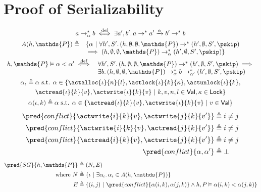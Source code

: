 \section{Proof of Serializability}

\begin{gather*}
a \rightarrow^*_\alpha b \overset{\text{def}}{\iff} \exists a', b' \ldotp a \rightarrow^* a' \xrightarrow{\alpha} b' \rightarrow^* b
\\
\begin{array}{l l}
	A(h, \mathds{P}) \triangleq &
	\{ \alpha\ |\ \forall h', S' \ldotp (h, \emptyset, \emptyset, \mathds{P}) \rightarrow^* (h', \emptyset, S', \pskip) \\
	& \implies (h, \emptyset, \emptyset, \mathds{P}) \rightarrow_\alpha^* (h', \emptyset, S', \pskip)
	\}
\end{array}
\\
\begin{array}{l l}
h, \mathds{P} \vDash \alpha < \alpha' \overset{\text{def}}{\iff}
&
\forall h', S' \ldotp (h, \emptyset, \emptyset, \mathds{P}) \rightarrow^* (h', \emptyset, S', \pskip) \implies
\\
& \exists b \ldotp (h, \emptyset, \emptyset, \mathds{P}) \rightarrow_\alpha^* b \rightarrow^*_{\alpha'} (h', \emptyset, S', \pskip)
\end{array}
\\
\alpha_\iota \triangleq \alpha \text{ s.t. } \alpha \in \{ \actalloc{\iota}{n}{l}, \actlock{\iota}{k}{\kappa}, \actunlock{\iota}{k}, \\ \actread{\iota}{k}{v}, \actwrite{\iota}{k}{v}\ |\ k, v, n, l \in \mathsf{Val}, \kappa \in \mathsf{Lock} \}
\\
\alpha(\iota, k) \triangleq \alpha \text{ s.t. } \alpha \in \{ \actread{\iota}{k}{v}, \actwrite{\iota}{k}{v}\ |\ v \in \mathsf{Val} \}
\end{gather*}
\begin{align*}
\pred{conflict}{\actwrite{i}{k}{v}, \actwrite{j}{k}{v'}} &\triangleq i \neq j
\\
\pred{conflict}{\actwrite{i}{k}{v}, \actread{j}{k}{v'}} &\triangleq i \neq j
\\
\pred{conflict}{\actread{i}{k}{v}, \actwrite{j}{k}{v'}} &\triangleq i \neq j
\\
\pred{conflict}{\alpha, \alpha'} &\triangleq \bot 
\end{align*}
\begin{align*}
\pred{SG}{h, \mathds{P}} &\triangleq (N, E) \\
\text{where } N &\triangleq \{ \iota\ |\ \exists \alpha_\iota \ldotp \alpha_\iota \in A(h, \mathds{P}) \} \\
E &\triangleq \{ (i, j)\ |\ \pred{conflict}{\alpha(i, k), \alpha(j, k)} \land h, P \vDash \alpha(i, k) < \alpha(j, k) \}
\end{align*}

